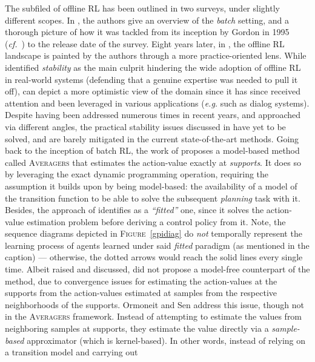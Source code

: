 The subfiled of offline RL has been outlined in two surveys, under slightly different scopes.
In \cite{Lange2012-cc},
the authors give an overview of the \textit{batch} setting, and a thorough picture of how it was tackled from
its inception by Gordon in 1995 (\textit{cf.}~\cite{Gordon1995-er})
to the release date of the survey.
Eight years later,
in \cite{Levine2020-hz},
the offline RL landscape is painted by the authors through a more practice-oriented lens.
While \cite{Lange2012-cc}
identified \emph{stability} as the main culprit hindering the wide adoption of offline RL in real-world systems
(defending that a genuine expertise was needed to pull it off),
\cite{Levine2020-hz}
can depict a more optimistic view of the domain since it has since received attention and been leveraged in
various applications (\textit{e.g.} such as dialog systems).
Despite having been addressed numerous times in recent years, and approached via different angles,
the practical stability issues discussed in \cite{Lange2012-cc}
have yet to be solved, and are barely mitigated in the current state-of-the-art methods.
Going back to the inception of batch RL,
the work of \cite{Gordon1995-er}
proposes a model-based method called \textsc{Averagers} that estimates the action-value exactly at
\textit{supports}. It does so by leveraging the exact dynamic programming operation,
requiring the assumption it builds upon by being model-based: the availability of a model of the transition function
to be able to solve the subsequent \emph{planning} task with it.
Besides, the approach of \cite{Gordon1995-er}
identifies as a \textit{``fitted''} one,
since it solves the action-value estimation problem before deriving a control policy from it.
Note, the sequence diagrams depicted in \textsc{Figure}~\ref{gpidiag} do \emph{not} temporally represent
the learning process of agents learned
under said \textit{fitted} paradigm (as mentioned in the caption) --- otherwise, the dotted arrows would reach
the solid lines every single time.
Albeit raised and discussed, \cite{Gordon1995-er}
did not propose a model-free counterpart of the method,
due to convergence issues for estimating the action-values at the supports
from the action-values estimated at samples from the respective neighborhoods of the supports.
Ormoneit and Sen \cite{Ormoneit2002-wk}
address this issue, though not in the \textsc{Averagers} framework.
Instead of attempting to estimate the values from neighboring samples
at supports, they
estimate the value directly via a \emph{sample-based} approximator (which is kernel-based).
In other words, instead of relying on a transition model and carrying out
